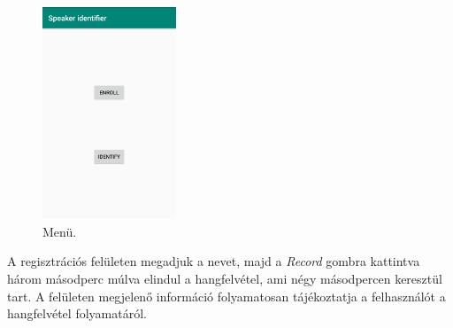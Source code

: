 \begin{figure}[!ht]
	\centering
	\includegraphics[width=40mm, keepaspectratio]{figures/app-main-screen.png}
	\caption{Menü.}
	\label{fig:app-main-screen}
\end{figure}

A regisztrációs felületen megadjuk a nevet, majd a \emph{Record} gombra kattintva három másodperc múlva elindul a hangfelvétel, ami négy másodpercen keresztül tart. A felületen megjelenő információ folyamatosan tájékoztatja a felhasználót a hangfelvétel folyamatáról.


